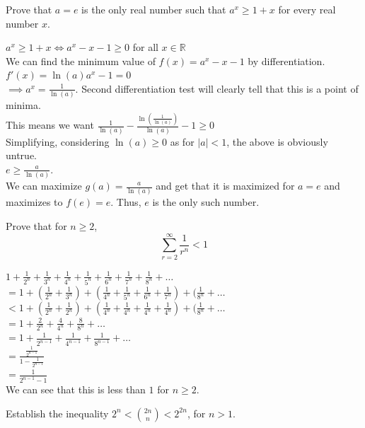 \begin{CL}
    Prove that $a=e$ is the only real number such that $a^x \ge 1+x$ for every real number $x$.
\end{CL} 
\begin{solution}
    $a^x \geq 1+x \iff a^x-x-1 \geq 0$ for all $x \in \mathbb{R}$\\
    We can find the minimum value of $f(x)=a^x-x-1$ by differentiation.\\
    $f'(x)=\ln(a)a^x-1=0$\\
    $\implies a^x = \frac{1}{\ln(a)}$. Second differentiation test will clearly tell that this is a point of minima.\\
    This means we want $\frac{1}{\ln(a)}-\frac{\ln(\frac{1}{\ln(a)})}{\ln(a)}-1 \ge 0$\\
    Simplifying, considering $\ln(a) \geq 0$ as for $|a|<1$, the above is obviously untrue.\\
    $e \ge \frac{a}{\ln(a)}$.\\
    We can maximize $g(a)=\frac{a}{\ln(a)}$ and get that it is maximized for $a=e$ and maximizes to $f(e)=e$. Thus, $e$ is the only such number.\\
\end{solution}
\begin{N}
    Prove that for $n\ge2$,
$$ \sum_{r=2}^{\infty}\frac{1}{r^n}<1$$
\end{N}
\begin{solution}
$1+\frac{1}{2^n}+\frac{1}{3^n}+\frac{1}{4^n}+\frac{1}{5^n}+\frac{1}{6^n}+\frac{1}{7^n}+\frac{1}{8^n}+\dots$\\
$=1+(\frac{1}{2^n}+\frac{1}{3^n})+(\frac{1}{4^n}+\frac{1}{5^n}+\frac{1}{6^n}+\frac{1}{7^n})+(\frac{1}{8^n}+\dots$\\
$<1+(\frac{1}{2^n}+\frac{1}{2^n})+(\frac{1}{4^n}+\frac{1}{4^n}+\frac{1}{4^n}+\frac{1}{4^n})+(\frac{1}{8^n}+\dots$\\
$=1+\frac{2}{2^n}+\frac{4}{4^n}+\frac{8}{8^n}+\dots$\\
$=1+\frac{1}{2^{n-1}}+\frac{1}{4^{n-1}}+\frac{1}{8^{n-1}}+\dots$\\
$= \frac{\frac{1}{2^{n-1}}}{1-\frac{1}{2^{n-1}}}$\\
$=\frac{1}{2^{n-1}-1}$\\
We can see that this is less than $1$ for $n\ge 2$.\\
\end{solution}
\begin{CB}
    Establish the inequality $2^n<$${2n}\choose{n}$$<2^{2n}$, for $n>1$.
\end{CB}
